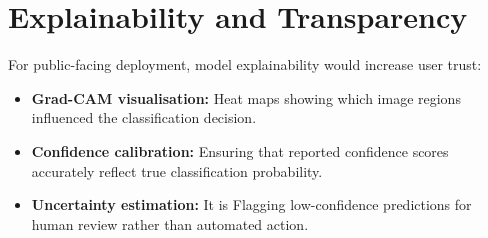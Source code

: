 \section{Explainability and Transparency}

For public-facing deployment, model explainability would increase user trust:
\begin{itemize}
    \item \textbf{Grad-CAM visualisation:} Heat maps showing which image regions influenced the classification decision.
    \item \textbf{Confidence calibration:} Ensuring that reported confidence scores accurately reflect true classification probability.
    \item \textbf{Uncertainty estimation:} It is  Flagging low-confidence predictions for human review rather than automated action.
\end{itemize}

